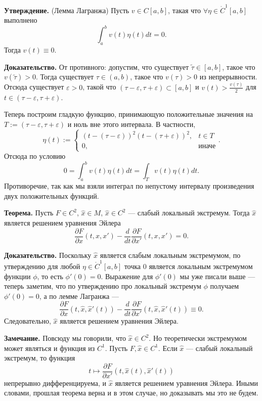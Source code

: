 \QED

\textbf{Утверждение.} (Лемма Лагранжа) Пусть $v \in C[a, b]$, такая что $\forall \eta \in \mathring C^1[a, b]$ выполнено
\[
     \int_a^b v(t) \eta(t) dt = 0.
\]
Тогда $v(t) \equiv 0$.

\textbf{Доказательство.} От противного: допустим, что существует $\tilde \tau \in [a, b]$, такое что $v(\tilde \tau) > 0$.
Тогда существует $\tau \in (a, b)$, такое что $v(\tau) > 0$ из непрерывности.
Отсюда существует $\varepsilon > 0$, такой что $(\tau - \varepsilon, \tau + \varepsilon) \subset [a, b]$ и $v(t) > \frac{v(\tau)}{2}$ для $t \in (\tau - \varepsilon, \tau + \varepsilon)$.

Теперь построим гладкую функцию, принимающую положительные значения на $T := (\tau - \varepsilon, \tau + \varepsilon)$ и ноль вне этого интервала.
В частности,
\[
    \eta(t) :=
    \begin{cases}
        (t - (\tau - \varepsilon))^2 (t - (\tau + \varepsilon))^2, & t \in T \\
        0, & \text{иначе}
    \end{cases}.
\]
Отсюда по условию
\[
    0 = \int_a^b v(t) \eta(t) dt = \int_T v(t) \eta(t) dt.
\]
Противоречие, так как мы взяли интеграл по непустому интервалу произведения двух положительных функций.

\QED

\textbf{Теорема.} Пусть $F \in C^2$, $\widehat x \in M$, $\widehat x \in C^2$ --- слабый локальный экстремум.
Тогда $\widehat x$ является решением уравнения Эйлера
\[
    \frac{\partial F}{\partial x} (t, x, x') - \frac{d}{dt} \frac{\partial F}{\partial x'} (t, x, x') = 0.
\]

\textbf{Доказательство.} Поскольку $\widehat x$ является слабым локальным экстремумом, по утверждению для любой $\eta \in \mathring C^1[a, b]$ точка $0$ является локальным экстремумом функции $\phi$, то есть $\phi'(0) = 0$.
Выражение для $\phi'(0)$ мы уже писали выше --- теперь заметим, что по утверждению про локальный экстремум $\phi$ получаем $\phi'(0) = 0$, а по лемме Лагранжа ---
\[
    \frac{\partial F}{\partial x} (t, \widehat x, \widehat x'(t)) - \frac{d}{dt} \frac{\partial F}{\partial x'} (t, \widehat x, \widehat x'(t)) \equiv 0.
\]
Следовательно, $\widehat x$ является решением уравнения Эйлера.

\QED

\textbf{Замечание.} Повсюду мы говорили, что $\widehat x \in C^2$.
Но теоретически экстремумом может являться и функция из $C^1$.
Пусть $F, \widehat x \in C^1$.
Если $\widehat x$ --- слабый локальный экстремум, то функция
\[
    t \mapsto \frac{\partial F}{\partial x'} (t, \widehat x(t), \widehat x'(t))
\]
непрерывно дифференцируема, и $\widehat x$ является решением уравнения Эйлера.
Иными словами, прошлая теорема верна и в этом случае, но доказывать мы это не будем.

